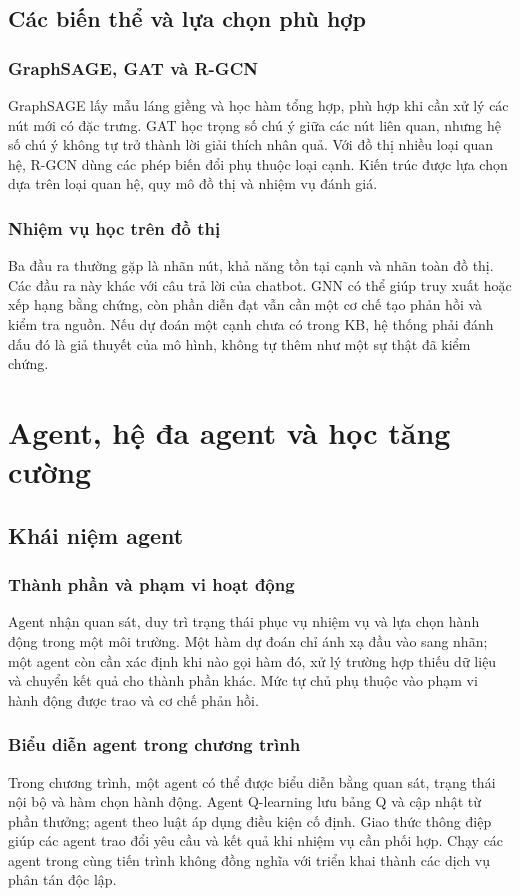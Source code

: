 \section{Các biến thể và lựa chọn phù hợp}
\subsection{GraphSAGE, GAT và R-GCN}
GraphSAGE lấy mẫu láng giềng và học hàm tổng hợp, phù hợp khi cần xử lý các nút mới có đặc trưng. GAT học trọng số chú ý giữa các nút liên quan, nhưng hệ số chú ý không tự trở thành lời giải thích nhân quả. Với đồ thị nhiều loại quan hệ, R-GCN dùng các phép biến đổi phụ thuộc loại cạnh. Kiến trúc được lựa chọn dựa trên loại quan hệ, quy mô đồ thị và nhiệm vụ đánh giá.

\subsection{Nhiệm vụ học trên đồ thị}
Ba đầu ra thường gặp là nhãn nút, khả năng tồn tại cạnh và nhãn toàn đồ thị. Các đầu ra này khác với câu trả lời của chatbot. GNN có thể giúp truy xuất hoặc xếp hạng bằng chứng, còn phần diễn đạt vẫn cần một cơ chế tạo phản hồi và kiểm tra nguồn. Nếu dự đoán một cạnh chưa có trong KB, hệ thống phải đánh dấu đó là giả thuyết của mô hình, không tự thêm như một sự thật đã kiểm chứng.

\chapter{Agent, hệ đa agent và học tăng cường}
\section{Khái niệm agent}
\subsection{Thành phần và phạm vi hoạt động}
Agent nhận quan sát, duy trì trạng thái phục vụ nhiệm vụ và lựa chọn hành động trong một môi trường. Một hàm dự đoán chỉ ánh xạ đầu vào sang nhãn; một agent còn cần xác định khi nào gọi hàm đó, xử lý trường hợp thiếu dữ liệu và chuyển kết quả cho thành phần khác. Mức tự chủ phụ thuộc vào phạm vi hành động được trao và cơ chế phản hồi.

\subsection{Biểu diễn agent trong chương trình}
Trong chương trình, một agent có thể được biểu diễn bằng quan sát, trạng thái nội bộ và hàm chọn hành động. Agent Q-learning lưu bảng Q và cập nhật từ phần thưởng; agent theo luật áp dụng điều kiện cố định. Giao thức thông điệp giúp các agent trao đổi yêu cầu và kết quả khi nhiệm vụ cần phối hợp. Chạy các agent trong cùng tiến trình không đồng nghĩa với triển khai thành các dịch vụ phân tán độc lập.
